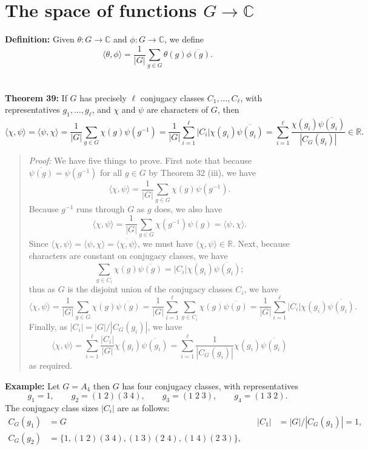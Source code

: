 {\section{The space of functions $G \rightarrow {\mathbb C}$}
{\bf Definition:} Given $\theta:G\rightarrow{\mathbb C}$ and
$\phi: G \rightarrow {\mathbb C}$, we define
$$\langle\theta,\phi\rangle
=\frac{1}{|G|}\sum_{g \in G} \theta(g) \overline{\phi(g)}.$$
\\
\\
{\bf Theorem 39:} If $G$ has precisely $\ell$ conjugacy
classes $C_1,\dots,C_\ell$, with representatives $g_1,\dots,g_\ell$, and
$\chi$ and $\psi$ are characters of $G$, then
$$\!\langle\chi,\psi\rangle=\langle\psi,\chi\rangle
=\frac{1}{|G|}\sum_{g\in G}\chi(g)\psi(g^{-1})
=\frac{1}{|G|}\sum_{i=1}^\ell|C_i|\chi(g_i)\overline{\psi(g_i)}
=\sum_{i=1}^\ell\frac{\chi(g_i)\overline{\psi(g_i)}}{|C_G(g_i)|}\in{\mathbb R}.\!$$
\begin{quote}
\emph{Proof:}
We have five things to prove. First note that because
$\overline{\psi(g)}=\psi(g^{-1})$ for all $g\in G$ by Theorem 32 (iii),
we have
$$\langle\chi,\psi\rangle=\frac{1}{|G|}\sum_{g\in G}\chi(g)\psi(g^{-1}).$$
Because $g^{-1}$ runs through $G$ as $g$ does, we also have
$$\langle\chi,\psi\rangle=\frac{1}{|G|}\sum_{g\in G}\chi(g^{-1})\psi(g)
=\langle\psi,\chi\rangle.$$
Since $\langle\chi,\psi\rangle=\langle\psi,\chi\rangle
=\overline{\langle\chi,\psi\rangle}$, we must have
$\langle\chi,\psi\rangle\in{\mathbb R}$. Next, because characters are constant on
conjugacy classes, we have
$$\sum_{g\in C_i}\chi(g)\overline{\psi(g)}
=|C_i|\chi(g_i)\overline{\psi(g_i)};$$
thus as $G$ is the disjoint union of the conjugacy classes $C_i$, we have
$$\langle\chi,\psi\rangle
=\frac{1}{|G|}\sum_{g\in G}\chi(g)\overline{\psi(g)}
=\frac{1}{|G|}\sum_{i=1}^\ell\sum_{g\in C_i}\chi(g)\overline{\psi(g)}
=\frac{1}{|G|}\sum_{i=1}^\ell|C_i|\chi(g_i)\overline{\psi(g_i)}.$$
Finally, as $|C_i|=|G|/|C_G(g_i)|$, we have
$$\langle\chi,\psi\rangle
=\sum_{i=1}^\ell\frac{|C_i|}{|G|}\chi(g_i)\overline{\psi(g_i)}
=\sum_{i=1}^\ell\frac{1}{|C_G(g_i)|}\chi(g_i)\overline{\psi(g_i)}$$
as required.
\end{quote}
{\bf Example:} Let $G=A_4$ then 
$G$ has four conjugacy classes, with
representatives 
$$g_1=1,\qquad g_2=(1\;2)(3\;4),\qquad g_3=(1\;2\;3),\qquad g_4=(1\;3\;2).$$
The conjugacy class sizes $|C_i|$ are as follows:
$$
\begin{array}{rlrl}
C_G(g_1)\!\!\!\!&=G&\quad |C_1|\!\!\!\!&=|G|/|C_G(g_1)|=1,\\
C_G(g_2)\!\!\!\!&=\{1,(1\;2)(3\;4),(1\;3)(2\;4),(1\;4)(2\;3)\},&

\end{array}$$}
